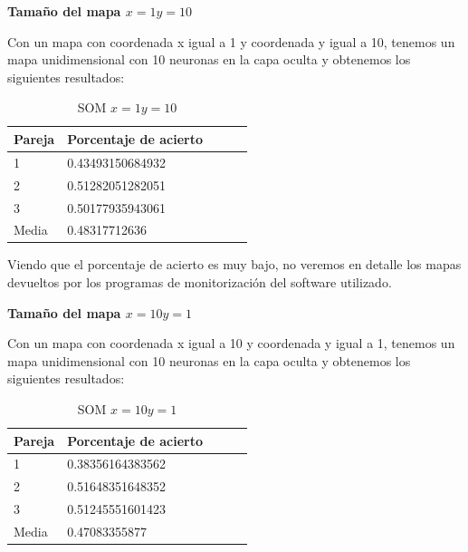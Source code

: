 \documentclass[11pt,spanish,listoffigures,listoftables]{workluis}
\begin{document}
\par \textbf{Tamaño del mapa $x=1 y=10$}

\par Con un mapa con coordenada x igual a 1 y coordenada y igual a 10, tenemos un mapa unidimensional con 10 neuronas en la capa oculta y obtenemos los siguientes resultados:

\begin{table}[H]
\centering
\caption{SOM $x=1 y=10$}
\label{tb:tb31}
\begin{tabular}{lllll}
\hline
\multicolumn{1}{|l|}{Pareja} & Porcentaje de acierto \\ \hline \hline
1                            & 0.43493150684932	     \\
2                            & 0.51282051282051		 \\
3                            & 0.50177935943061      \\
Media                        & 0.48317712636         \\ \hline
\end{tabular}
\end{table}

\par Viendo que el porcentaje de acierto es muy bajo, no veremos en detalle los mapas devueltos por los programas de monitorización del software utilizado.


\par \textbf{Tamaño del mapa $x=10 y=1$}

\par Con un mapa con coordenada x igual a 10 y coordenada y igual a 1, tenemos un mapa unidimensional con 10 neuronas en la capa oculta y obtenemos los siguientes resultados:

\begin{table}[H]
\centering
\caption{SOM $x=10 y=1$}
\label{tb:tb32}
\begin{tabular}{lllll}
\hline
\multicolumn{1}{|l|}{Pareja} & Porcentaje de acierto \\ \hline \hline
1                            & 0.38356164383562	     \\
2                            & 0.51648351648352		 \\
3                            & 0.51245551601423      \\
Media                        & 0.47083355877         \\ \hline
\end{tabular}
\end{table}
\end{document}
